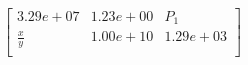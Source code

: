 \begin{equation}
\left[
\begin{array}{ccc}
3.29e+07 & 1.23e+00 & P_{1} \\
\frac{x}{y} & 1.00e+10 & 1.29e+03 \\
\end{array}
\right]
\end{equation}
